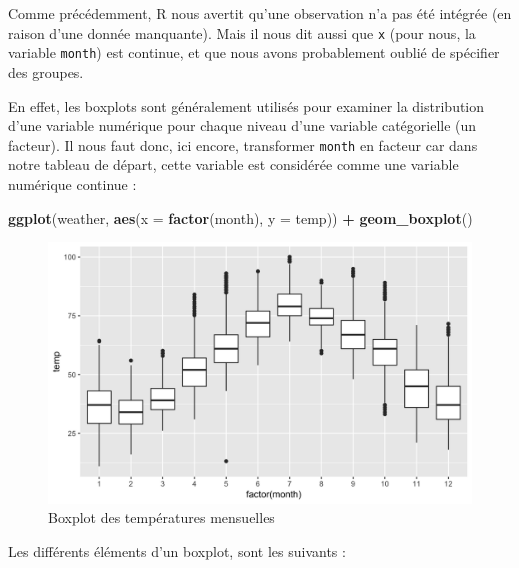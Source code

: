 \documentclass[a4paperpaper,]{article}
\newenvironment{Shaded}{\begin{snugshade}}{\end{snugshade}}
\newcommand{\KeywordTok}[1]{\textcolor[rgb]{0.13,0.29,0.53}{\textbf{#1}}}
\newcommand{\DataTypeTok}[1]{\textcolor[rgb]{0.13,0.29,0.53}{#1}}
\newcommand{\StringTok}[1]{\textcolor[rgb]{0.31,0.60,0.02}{#1}}
\newcommand{\OperatorTok}[1]{\textcolor[rgb]{0.81,0.36,0.00}{\textbf{#1}}}
\newcommand{\NormalTok}[1]{#1}
\theoremstyle{definition}
\theoremstyle{definition}
\theoremstyle{definition}
\theoremstyle{remark}
\begin{document}
Comme précédemment, R nous avertit qu'une observation n'a pas été
intégrée (en raison d'une donnée manquante). Mais il nous dit aussi que
\texttt{x} (pour nous, la variable \texttt{month}) est continue, et que
nous avons probablement oublié de spécifier des groupes.

En effet, les boxplots sont généralement utilisés pour examiner la
distribution d'une variable numérique pour chaque niveau d'une variable
catégorielle (un facteur). Il nous faut donc, ici encore, transformer
\texttt{month} en facteur car dans notre tableau de départ, cette
variable est considérée comme une variable numérique continue :

\begin{Shaded}
\begin{Highlighting}[]
\KeywordTok{ggplot}\NormalTok{(weather, }\KeywordTok{aes}\NormalTok{(}\DataTypeTok{x =} \KeywordTok{factor}\NormalTok{(month), }\DataTypeTok{y =}\NormalTok{ temp)) }\OperatorTok{+}
\StringTok{  }\KeywordTok{geom_boxplot}\NormalTok{()}
\end{Highlighting}
\end{Shaded}

\begin{figure}[htpb]

{\centering \includegraphics[width=0.9\linewidth]{figure/unnamed-chunk-56-1} 

}

\caption{Boxplot des températures mensuelles}\label{fig:unnamed-chunk-56}
\end{figure}

Les différents éléments d'un boxplot, sont les suivants :
\end{document}
